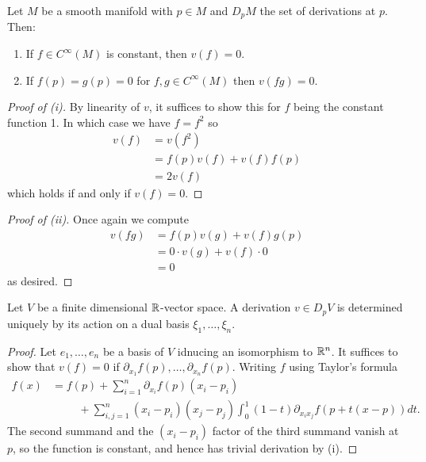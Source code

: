\begin{lemma}\label{lem: properties of derivations}
    Let $M$ be a smooth manifold with $p\in M$ and $D_{p}M$ the set of derivations at $p$. Then: 
    \begin{enumerate}[label=(\roman*)]
        \item If $f\in C^{\infty}(M)$ is constant, then $v(f)=0$. 
        \item If $f(p)=g(p)=0$ for $f,g\in C^{\infty}(M)$ then $v(fg)=0$. 
    \end{enumerate}
\end{lemma}
\begin{proof}[Proof of (i)]
    By linearity of $v$, it suffices to show this for $f$ being the constant function 1. In which case we have $f=f^{2}$ so 
    \begin{align*}
        v(f) &= v(f^{2}) \\
        &= f(p)v(f)+v(f)f(p) \\
        &= 2v(f)
    \end{align*}
    which holds if and only if $v(f)=0$. 
\end{proof}
\begin{proof}[Proof of (ii)]
    Once again we compute
    \begin{align*}
        v(fg) &= f(p)v(g)+v(f)g(p) \\
        &= 0\cdot v(g)+v(f)\cdot 0\\
        &=0
    \end{align*}
    as desired. 
\end{proof}
\begin{lemma}\label{lem: derivation determined by action on dual basis}
    Let $V$ be a finite dimensional $\mathbb{R}$-vector space. A derivation $v\in D_{p}V$ is determined uniquely by its action on a dual basis $\xi_{1},\dots,\xi_{n}$. 
\end{lemma}
\begin{proof}
    Let $e_{1},\dots,e_{n}$ be a basis of $V$ idnucing an isomorphism to $\mathbb{R}^{n}$. It suffices to show that $v(f)=0$ if $\partial_{x_{1}}f(p),\dots,\partial_{x_{n}}f(p)$. Writing $f$ using Taylor's formula 
    \begin{align*}
        f(x)&=f(p)+\sum_{i=1}^{n}\partial_{x_{i}}f(p)(x_{i}-p_{i})\\
        &\hspace{1cm}+\sum_{i,j=1}^{n}(x_{i}-p_{i})(x_{j}-p_{j})\int_{0}^{1}(1-t)\partial_{x_{i}x_{j}}f(p+t(x-p))dt.
    \end{align*}
    The second summand and the $(x_{i}-p_{i})$ factor of the third summand vanish at $p$, so the function is constant, and hence has trivial derivation by  (i). 
\end{proof}
